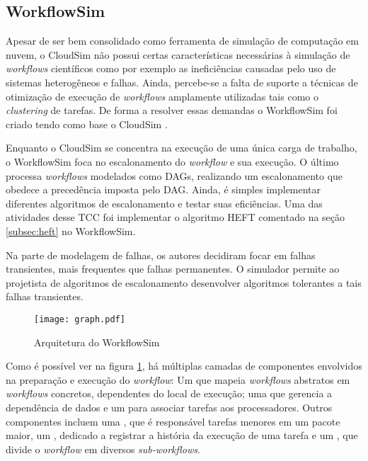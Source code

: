 \subsection{WorkflowSim}
\label{subsec:workflowsim}
Apesar de ser bem consolidado como ferramenta de simulação de computação em nuvem,
o CloudSim não possui certas características necessárias à simulação de 
\emph{workflows} científicos como por exemplo as ineficiências causadas pelo
uso de sistemas heterogêneos e falhas. Ainda, percebe-se a falta de suporte a 
técnicas de otimização de execução de \emph{workflows} amplamente utilizadas
tais como o \emph{clustering} de tarefas. De forma a resolver essas demandas
o WorkflowSim foi criado tendo como base o CloudSim \cite{chen:workflowsim}.

Enquanto o CloudSim se concentra na execução de uma única carga de trabalho,
o WorkflowSim foca no escalonamento do \emph{workflow} e sua execução. O último
processa \emph{workflows} modelados como DAGs, realizando um escalonamento que 
obedece a precedência imposta pelo DAG. Ainda, é simples implementar diferentes
algoritmos de escalonamento e testar suas eficiências. Uma das atividades desse
TCC foi implementar o algoritmo HEFT comentado na seção \ref{subsec:heft} no 
WorkflowSim.

Na parte de modelagem de falhas, os autores decidiram focar em falhas transientes,
mais frequentes que falhas permanentes. O simulador permite ao projetista de
algoritmos de escalonamento desenvolver algoritmos tolerantes a tais falhas 
transientes.

\begin{figure}[ht]
\centering
\texttt{[image: graph.pdf]}
\caption{Arquitetura do WorkflowSim}
\label{fig:arquitetura_workflowsim}
\end{figure}

Como é possível ver na figura \ref{fig:arquitetura_workflowsim}, há múltiplas 
camadas de componentes envolvidos na preparação e execução do \emph{workflow}:
Um  que mapeia \emph{workflows} abstratos em
\emph{workflows} concretos, dependentes do local de execução; uma  que gerencia a dependência de dados e um  para 
associar tarefas aos processadores. Outros componentes incluem uma , que é responsável tarefas menores em um pacote maior, um , dedicado a registrar a história da execução de uma tarefa e um 
, que divide o \emph{workflow} em diversos
\emph{sub-workflows}. 


